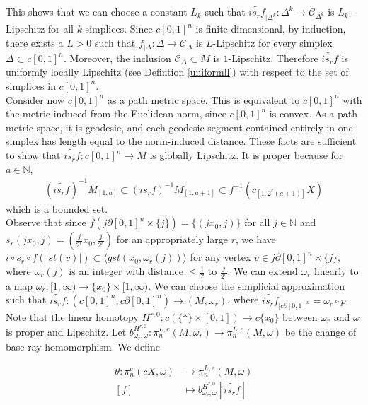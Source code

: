\documentclass[a4paper,11pt]{article}
\theoremstyle{definition}
\theoremstyle{plain}
\theoremstyle{remark}
\begin{document}
{This shows that we can choose a constant $L_{k}$ such that $\widetilde{is_{r}f}_{|\Delta^{k}}: \Delta^{k} \rightarrow \mathscr{C}_{\Delta^k}$ is $L_{k}$-Lipschitz for all $k$-simplices. Since $c[0,1]^n$ is finite-dimensional, by induction, there exists a $L>0$ such that $f_{|\Delta}: \Delta \rightarrow \mathscr{C}_{\Delta}$ is $L$-Lipschitz for every simplex $\Delta\subset c[0,1]^n$. Moreover, the inclusion $\mathscr{C}_{\Delta} \subset M$ is $1$-Lipschitz. Therefore $\widetilde{is_{r}f}$ is uniformly locally Lipschitz (see Defintion \ref{uniformll}) with respect to the set of simplices in $c[0,1]^n$.\\

Consider now $c[0,1]^n$ as a path metric space. This is equivalent to $c[0,1]^n$ with the metric induced from the Euclidean norm, since $c[0,1]^n$ is convex. As a path metric space, it is geodesic, and each geodesic segment contained entirely in one simplex has length equal to the norm-induced distance. These facts are sufficient to show that $\widetilde{is_{r}f}: c[0,1]^n \rightarrow M$ is globally Lipschitz. It is proper because for $a\in \mathbb{N}$,
\begin{align*}
(\widetilde{is_{r}f})^{-1}M_{[1,a]} \subset  (is_{r}f)^{-1} M_{[1,a+1]}\subset f^{-1}(c_{[1,2^r(a+1)]}X)
\end{align*}
which is a bounded set. \\



Observe that since $f(j\partial[0,1]^n \times \{j\}) = \{(jx_0,j)\}$ for all $j\in \mathbb{N}$ and $s_{r}(jx_0,j) = (\frac{j}{2^r}x_0,\frac{j}{2^r})$ for an appropriately large $r$, we have $i\circ s_{r} \circ f(|st(v)|)\subset \langle gst(x_0,\omega_{r}(j))\rangle $ for any vertex $v\in j\partial[0,1]^n \times \{j\}$, where $\omega_r(j)$ is an integer with distance $\leq \frac{1}{2}$ to $\frac{j}{2^r}$. We can extend $\omega_{r}$ linearly to a map $\omega_{r}: [1,\infty) \rightarrow \{x_0\} \times [1,\infty)$. We can choose the simplicial approximation such that $\widetilde{is_{r}f}: (c[0,1]^n, c\partial[0,1]^n)\rightarrow (M,\omega_r)$, where $\widetilde{is_{r}f}_{|c\partial[0,1]^n} = \omega_r\circ p$. Note that the linear homotopy $H^{r,0}:  c(\{\ast\}\times [0,1]) \rightarrow c\{x_0\}$ between $\omega_r$ and $\omega$ is proper and Lipschitz. Let $b^{H^{r,0}}_{\omega_r,\omega}:  \pi^{L,e}_{n}(M,\omega_r)\rightarrow \pi^{L,e}_{n}(M,\omega)$ be the change of base ray homomorphism. We define 

\begin{align*}
\theta: \pi_n ^{c}(cX,\omega)&\rightarrow \pi^{L,e}_{n}(M,\omega)\\
[f]&\mapsto b^{H^{r,0}}_{\omega_r,\omega}[\widetilde{is_{r}f}]
\end{align*}

}
\end{document}
